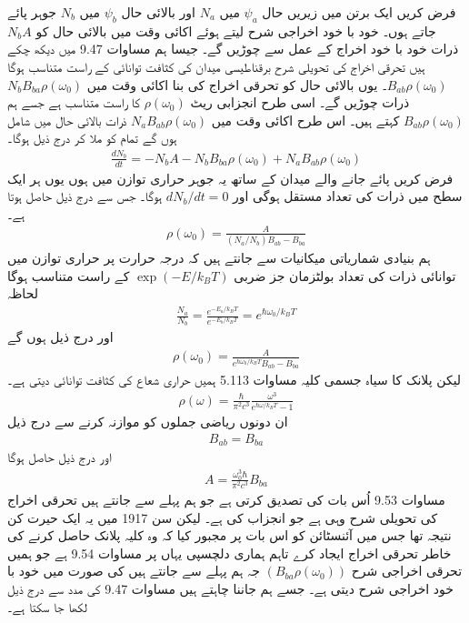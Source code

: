 فرض کریں ایک برتن میں زیریں حال \(\psi_a\) میں \(N_a\) اور بالائی حال \(\psi_b\) میں \(N_b\) جوہر پائے جاتے ہوں۔ خود با خود اخراجی شرح  لیتے ہوئے اکائی وقت میں بالائی حال کو \(N_bA\) ذرات خود با خود اخراج کے عمل سے چوڑیں گے۔ جیسا ہم مساوات \num{9.47} میں دیکھ چکے ہیں تحرقی اخراج کی تحویلی شرح برقناطیسی میدان کی کثافت توانائی کے راست متناسب ہوگا \(B_{ab}\rho(\omega_0)\)۔ یوں بالائی حال کو تحرقی اخراج کی بنا اکائی وقت میں \(N_bB_{ba}\rho(\omega_0)\) ذرات چوڑیں گے۔ اسی طرح انجزابی ریٹ \(\rho(\omega_0)\) کا راست متناسب ہے جسے ہم \(B_{ab}\rho(\omega_0)\) کہتے ہیں۔ اس طرح اکائی وقت میں \(N_aB_{ab}\rho(\omega_0)\) ذرات بالائی حال میں شامل ہوں گے تمام کو ملا کر درج ذیل ہوگا۔
\begin{align}
	\frac{dN_b}{dt} = -N_bA-N_bB_{ba}\rho(\omega_0)+N_aB_{ab}\rho(\omega_0)
\end{align}
فرض کریں پائے جانے والے میدان کے ساتھ یہ جوہر حراری توازن میں ہوں یوں ہر ایک سطح میں ذرات کی تعداد مستقل ہوگی اور \(dN_b/dt = 0\) ہوگا۔ جس سے درج ذیل حاصل ہوتا ہے۔
\begin{align}
	\rho(\omega_0) = \frac{A}{(N_a/N_b)B_{ab}-B_{ba}}
\end{align}
ہم بنیادی شماریاتی میکانیات سے جانتے ہیں کہ درجہ حرارت  پر حراری توازن میں توانائی  ذرات کی تعداد بولٹزمان جز ضربی \(\exp(-E/k_BT)\) کے راست متناسب ہوگا لحاظہ
\begin{align}
	\frac{N_a}{N_b} = \frac{e^{-E_a/k_{B}T}}{e^{-E_b/k_BT}} = e^{\hbar\omega_0/k_BT}
\end{align}
اور درج ذیل ہوں گے
\begin{align}
	\rho(\omega_0) = \frac{A}{e^{\hbar\omega_0/k_BT}B_{ab}-B_{ba}}
\end{align}
لیکن پلانک کا سیاہ جسمی کلیہ مساوات \num{5.113} ہمیں حراری شعاع کی کثافت توانائی دیتی ہے۔
\begin{align}
	\rho(\omega) = \frac{\hbar}{\pi^2c^3}\frac{\omega^3}{e^{\hbar\omega/k_BT}-1}
\end{align}
ان دونوں ریاضی جملوں کو موازنہ کرنے سے درج ذیل 
\begin{align}
	B_{ab} = B_{ba}
\end{align}
اور درج ذیل حاصل ہوگا
\begin{align}
	A = \frac{\omega^3_0\hbar}{\pi^2c^3}B_{ba}
\end{align}
مساوات \num{9.53} اُس بات کی تصدیق کرتی ہے جو ہم پہلے سے جانتے ہیں تحرقی اخراج کی تحویلی شرح وہی ہے جو انجزاب کی ہے۔ لیکن سن \num{1917} میں یہ ایک حیرت کن نتیجہ تھا جس میں آئنسٹائن کو اس بات پر مجبور کیا کہ وہ کلیہ پلانک حاصل کرنے کی خاطر تحرقی اخراج ایجاد کرے تاہم ہماری دلچسپی یہاں پر مساوات \num{9.54} ہے جو ہمیں تحرقی اخراجی شرح \((B_{ba}\rho(\omega_0))\) جہ ہم پہلے سے جانتے ہیں کی صورت میں خود با خود اخراجی شرح  دیتی ہے۔ جسے ہم جاننا چاہتے ہیں مساوات \num{9.47} کی مدد سے درج ذیل لکھا جا سکتا ہے۔
